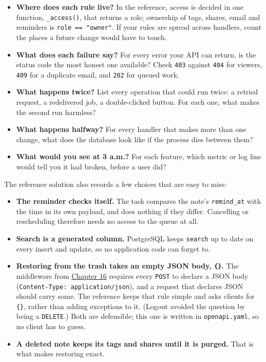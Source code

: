 \begin{itemize}
\tightlist
\item
  \textbf{Where does each rule live?} In the reference, access is decided in one function, \texttt{\_access()}, that returns a role; ownership of tags, shares, email and reminders is \texttt{role\ ==\ "owner"}. If your rules are spread across handlers, count the places a future change would have to touch.
\item
  \textbf{What does each failure say?} For every error your API can return, is the status code the most honest one available? Check \texttt{403} against \texttt{404} for viewers, \texttt{409} for a duplicate email, and \texttt{202} for queued work.
\item
  \textbf{What happens twice?} List every operation that could run twice: a retried request, a redelivered job, a double-clicked button. For each one, what makes the second run harmless?
\item
  \textbf{What happens halfway?} For every handler that makes more than one change, what does the database look like if the process dies between them?
\item
  \textbf{What would you see at 3 a.m.?} For each feature, which metric or log line would tell you it had broken, before a user did?
\end{itemize}

\noindent{}The reference solution also records a few choices that are easy to miss:

\begin{itemize}
\tightlist
\item
  \textbf{The reminder checks itself.} The task compares the note's \texttt{remind\_at} with the time in its own payload, and does nothing if they differ. Cancelling or rescheduling therefore needs no access to the queue at all.
\item
  \textbf{Search is a generated column.} PostgreSQL keeps \texttt{search} up to date on every insert and update, so no application code can forget to.
\item
  \textbf{Restoring from the trash takes an empty JSON body, \texttt{\{\}}.} The middleware from \hyperref[ch:16-logging-error-handling]{Chapter 16} requires every \texttt{POST} to declare a JSON body (\texttt{Content-}\allowbreak{}\texttt{Type:}\allowbreak{}\texttt{\ application/}\allowbreak{}\texttt{json}), and a request that declares JSON should carry some. The reference keeps that rule simple and asks clients for \texttt{\{\}}, rather than adding exceptions to it. (Logout avoided the question by being a \texttt{DELETE}.) Both are defensible; this one is written in \texttt{openapi.yaml}, so no client has to guess.
\item
  \textbf{A deleted note keeps its tags and shares until it is purged.} That is what makes restoring exact.
\end{itemize}


